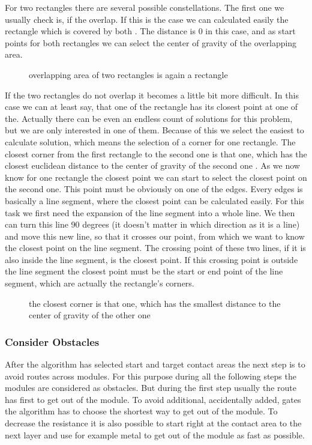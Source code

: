 For two rectangles there are several possible constellations. The first one we usually check is, if the overlap. If this is the case we can calculated easily the rectangle which is covered by both . The distance is 0 in this case, and as start points for both rectangles we can select the center of gravity of the overlapping area.

\begin{figure}
	\centering
	
  	\caption{overlapping area of two rectangles is again a rectangle}
	\label{fig:rectangles_overlapping}
\end{figure}

If the two rectangles do not overlap it becomes a little bit more difficult. In this case we can at least say, that one of the rectangle has its closest point at one of the. Actually there can be even an endless count of solutions for this problem, but we are only interested in one of them. Because of this we select the easiest to calculate solution, which means the selection of a corner for one rectangle. The closest corner from the first rectangle to the second one is that one, which has the closest euclidean distance to the center of gravity of the second one . As we now know for one rectangle the closest point we can start to select the closest point on the second one. This point must be obviously on one of the edges. Every edges is basically a line segment, where the closest point can be calculated easily. For this task we first need the expansion of the line segment into a whole line. We then can turn this line 90 degrees (it doesn't matter in which direction as it is a line) and move this new line, so that it crosses our point, from which we want to know the closest point on the line segment. The crossing point of these two lines, if it is also inside the line segment, is the closest point. If this crossing point is outside the line segment the closest point must be the start or end point of the line segment, which are actually the rectangle's corners.

\begin{figure}
	\centering
	
  	\caption{the closest corner is that one, which has the smallest distance to the center of gravity of the other one}
	\label{fig:rectangles_closest_corner}
\end{figure}

\subsubsection{Consider Obstacles}
After the algorithm has selected start and target contact areas the next step is to avoid routes across modules. For this purpose during all the following steps the modules are considered as obstacles. But during the first step usually the route has first to get out of the module. To avoid additional, accidentally added, gates the algorithm has to choose the shortest way to get out of the module. To decrease the resistance it is also possible to start right at the contact area to the next layer and use for example metal to get out of the module as fast as possible.

